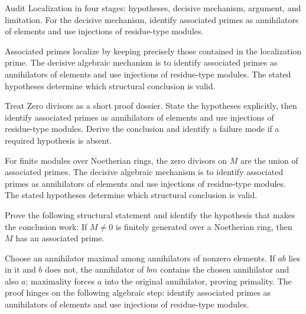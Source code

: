 \begin{problem}\label{prob:v17-problem-07}
Audit Localization in four stages: hypotheses, decisive mechanism, argument, and limitation. For the decisive mechanism, identify associated primes as annihilators of elements and use injections of residue-type modules.
\end{problem}
\begin{solution}
Associated primes localize by keeping precisely those contained in the localization prime. The decisive algebraic mechanism is to identify associated primes as annihilators of elements and use injections of residue-type modules. The stated hypotheses determine which structural conclusion is valid.
\end{solution}

\begin{problem}\label{prob:v17-problem-08}
Treat Zero divisors as a short proof dossier. State the hypotheses explicitly, then identify associated primes as annihilators of elements and use injections of residue-type modules. Derive the conclusion and identify a failure mode if a required hypothesis is absent.
\end{problem}
\begin{solution}
For finite modules over Noetherian rings, the zero divisors on $M$ are the union of associated primes. The decisive algebraic mechanism is to identify associated primes as annihilators of elements and use injections of residue-type modules. The stated hypotheses determine which structural conclusion is valid.
\end{solution}

\begin{problem}\label{prob:v17-problem-09}
Prove the following structural statement and identify the hypothesis that makes the conclusion work: If $M\ne0$ is finitely generated over a Noetherian ring, then $M$ has an associated prime.
\end{problem}
\begin{solution}
Choose an annihilator maximal among annihilators of nonzero elements. If $ab$ lies in it and $b$ does not, the annihilator of $bm$ contains the chosen annihilator and also $a$; maximality forces $a$ into the original annihilator, proving primality. The proof hinges on the following algebraic step: identify associated primes as annihilators of elements and use injections of residue-type modules.
\end{solution}

